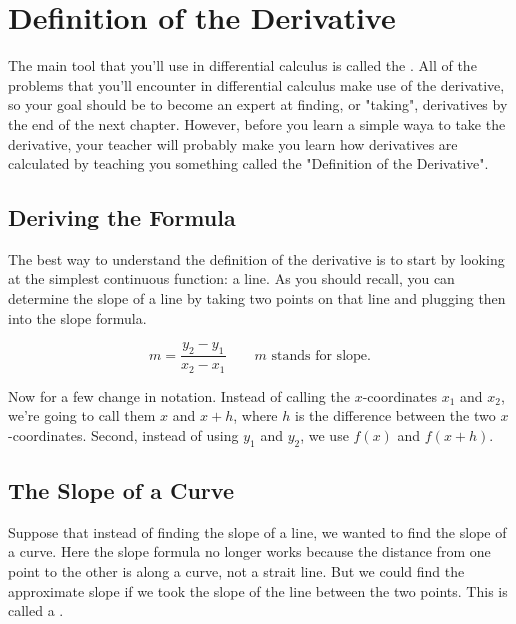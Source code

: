 \chapter{Definition of the Derivative}

The main tool that you'll use in differential calculus is called the . All of the problems that you'll encounter in differential calculus make use of the derivative, so your goal should be to become an expert at finding, or "taking", derivatives by the end of the next chapter. However, before you learn a simple waya to take the derivative, your teacher will probably make you learn how derivatives are calculated by teaching you something called the "Definition of the Derivative".

\section{Deriving the Formula}
The best way to understand the definition of the derivative is to start by looking at the simplest continuous function: a line. As you should recall, you can determine the slope of a line by taking two points on that line and plugging then into the slope formula.

$$m=\dfrac{y_2-y_1}{x_2-x_1}\qquad m\text{ stands for slope.}$$

Now for a few change in notation. Instead of calling the $x$-coordinates $x_1$ and $x_2$, we're going to call them $x$ and $x+h$, where $h$ is the difference between the two $x$-coordinates. Second, instead of using $y_1$ and $y_2$, we use $f(x)$ and $f(x+h)$. 

\section{The Slope of a Curve}
Suppose that instead of finding the slope of a line, we wanted to find the slope of a curve. Here the slope formula no longer works because the distance from one point to the other is along a curve, not a strait line. But we could find the approximate slope if we took the slope of the line between the two points. This is called a .

